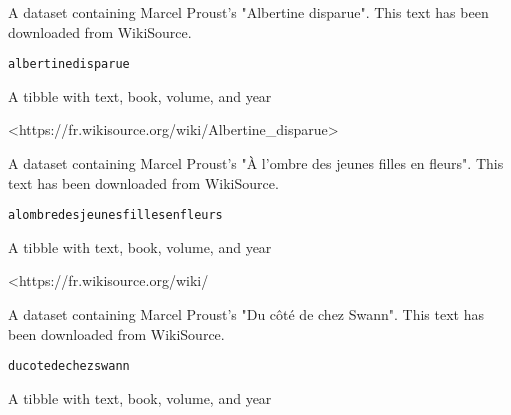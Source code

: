 \documentclass[a4paper]{book}
\begin{document}
%
\begin{Description}\relax
A dataset containing Marcel Proust's "Albertine disparue". 
This text has been downloaded from WikiSource.
\end{Description}
%
\begin{Usage}
\begin{verbatim}
albertinedisparue
\end{verbatim}
\end{Usage}
%
\begin{Format}
A tibble with text, book, volume, and year
\end{Format}
%
\begin{Source}\relax
<https://fr.wikisource.org/wiki/Albertine\_disparue>
\end{Source}
%
\begin{Description}\relax
A dataset containing Marcel Proust's "À l’ombre des jeunes filles en fleurs". 
This text has been downloaded from WikiSource.
\end{Description}
%
\begin{Usage}
\begin{verbatim}
alombredesjeunesfillesenfleurs
\end{verbatim}
\end{Usage}
%
\begin{Format}
A tibble with text, book, volume, and year
\end{Format}
%
\begin{Source}\relax
<https://fr.wikisource.org/wiki/
\end{Source}
%
\begin{Description}\relax
A dataset containing Marcel Proust's "Du côté de chez Swann". 
This text has been downloaded from WikiSource.
\end{Description}
%
\begin{Usage}
\begin{verbatim}
ducotedechezswann
\end{verbatim}
\end{Usage}
%
\begin{Format}
A tibble with text, book, volume, and year
\end{Format}
\end{document}
